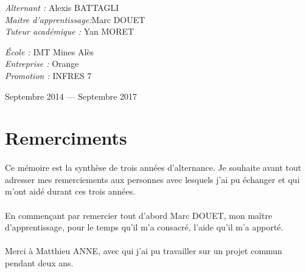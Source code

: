 \documentclass[12pt,a4paper]{report}
\begin{document}
\begin{titlepage}
\begin{center}
    \begin{minipage}{0.55\textwidth}
      \begin{flushleft} \large
        \emph{Alternant :} Alexis \textsc{BATTAGLI}\\
        \emph{Maitre d'apprentissage:}Marc \textsc{DOUET}\\
        \emph{Tuteur académique : } Yan \textsc{MORET}
      \end{flushleft}
    \end{minipage}
    \begin{minipage}{0.4\textwidth}
      \begin{flushright} \large
      	\emph{École :} IMT Mines Alès\\
       	\emph{Entreprise :} Orange\\
        \emph{Promotion :} INFRES 7\\
      \end{flushright}
    \end{minipage}

    \vfill

    {\large Septembre 2014 — Septembre 2017}

  \end{center}
\end{titlepage}

\newpage
\tableofcontents

\newpage
\listoffigures

\newpage
\listoftables

\newpage
\printnoidxglossary[type=\acronymtype]

\newpage
\section*{Remerciments}
\paragraph*{}Ce mémoire est la synthèse de trois années d'alternance. Je souhaite avant tout adresser mes remerciements aux personnes avec lesquels j'ai pu échanger et qui m'ont aidé durant ces trois années.
\paragraph*{}En commençant par remercier tout d'abord Marc DOUET, mon maître d'apprentissage, pour le temps qu'il m'a consacré, l'aide qu'il m'a apporté.
\paragraph*{}Merci à Matthieu ANNE, avec qui j'ai pu travailler sur un projet commun pendant deux ans.
\end{document}
